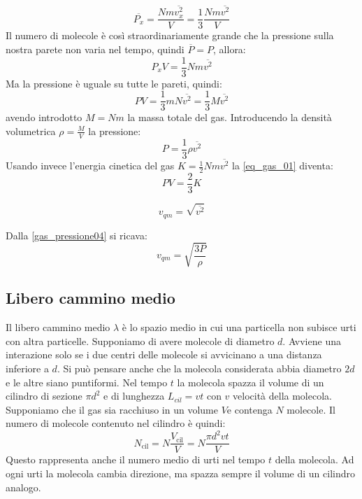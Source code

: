 \begin{equation}
\overline{P_x}=\frac{Nm\overline{v_x^2}}{V}=\frac{1}{3}\frac{Nm\overline{v^2}}{V}
\end{equation}
Il numero di molecole è così straordinariamente grande che la pressione sulla nostra parete non varia nel tempo, quindi $\overline P=P$, allora:
\[P_x V=\frac{1}{3}Nm\overline{v^2}\]
Ma la pressione è uguale su tutte le pareti, quindi:
\begin{equation}
PV=\frac{1}{3}mN\overline {v^2}=\frac{1}{3}M\overline{v^2}
\label{eq_gas_01}
\end{equation}
avendo introdotto $M=Nm$ la massa totale del gas. Introducendo la densità volumetrica $\rho=\frac{M}{V}$ la pressione:
\begin{equation}
P=\frac{1}{3}\rho\overline{v^2}
\label{gas_pressione04}
\end{equation}
Usando invece l'energia cinetica del gas $K=\frac{1}{2}Nm\overline{v^2}$ la \eqref{eq_gas_01} diventa:
\begin{equation}
PV=\frac{2}{3}K
\end{equation}
\begin{Def}
\begin{equation}
v_{qm}=\sqrt{\overline{v^2}}
\end{equation}
\end{Def}
Dalla \eqref{gas_pressione04} si ricava:
\begin{equation}
v_{qm}=\sqrt{\frac{3P}{\rho}}
\end{equation}
\subsection{Libero cammino medio}
\label{libero cammino medio fisica1}
Il libero cammino medio $\lambda$ è lo spazio medio in cui una particella non subisce urti con altra particelle. Supponiamo di avere molecole di diametro $d$. Avviene una interazione solo se i due centri delle molecole si avvicinano a una distanza inferiore a $d$. Si può pensare anche che la molecola considerata abbia diametro $2d$ e le altre siano puntiformi. Nel tempo $t$ la molecola spazza il volume di un cilindro di sezione $\pi d^2$ e di lunghezza $L_{cil}=vt$ con $v$ velocità della molecola. Supponiamo che il gas sia racchiuso in un volume $V$e contenga $N$ molecole. Il numero di molecole contenuto nel cilindro è quindi:
\[N_{\text{cil}}=N\frac{V_{\text{cil}}}{V}=N\frac{\pi d^2vt}{V}\]
Questo rappresenta anche il numero medio di urti nel tempo $t$ della molecola. Ad ogni urti la molecola cambia direzione, ma spazza sempre il volume di un cilindro analogo.

